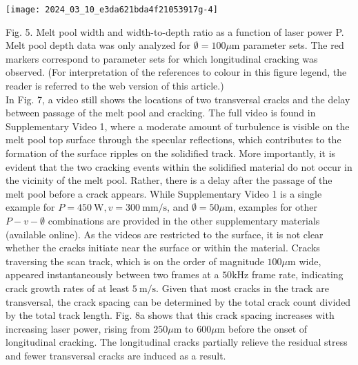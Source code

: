 \documentclass[10pt]{article}
\begin{document}
\begin{center}
\texttt{[image: 2024\_03\_10\_e3da621bda4f21053917g-4]}
\end{center}

Fig. 5. Melt pool width and width-to-depth ratio as a function of laser power P. Melt pool depth data was only analyzed for $\emptyset=100 \mu \mathrm{m}$ parameter sets. The red markers correspond to parameter sets for which longitudinal cracking was observed. (For interpretation of the references to colour in this figure legend, the reader is referred to the web version of this article.)\\
In Fig. 7, a video still shows the locations of two transversal cracks and the delay between passage of the melt pool and cracking. The full video is found in Supplementary Video 1, where a moderate amount of turbulence is visible on the melt pool top surface through the specular reflections, which contributes to the formation of the surface ripples on the solidified track. More importantly, it is evident that the two cracking events within the solidified material do not occur in the vicinity of the melt pool. Rather, there is a delay after the passage of the melt pool before a crack appears. While Supplementary Video 1 is a single example for $P=450 \mathrm{~W}, v=300 \mathrm{~mm} / \mathrm{s}$, and $\emptyset=50 \mu \mathrm{m}$, examples for other $P-v-\emptyset$ combinations are provided in the other supplementary materials (available online). As the videos are restricted to the surface, it is not clear whether the cracks initiate near the surface or within the material. Cracks traversing the scan track, which is on the order of magnitude $100 \mu \mathrm{m}$ wide, appeared instantaneously between two frames at a $50 \mathrm{kHz}$ frame rate, indicating crack growth rates of at least $5 \mathrm{~m} / \mathrm{s}$. Given that most cracks in the track are transversal, the crack spacing can be determined by the total crack count divided by the total track length. Fig. 8a shows that this crack spacing increases with increasing laser power, rising from $250 \mu \mathrm{m}$ to $600 \mu \mathrm{m}$ before the onset of longitudinal cracking. The longitudinal cracks partially relieve the residual stress and fewer transversal cracks are induced as a result.
\end{document}
